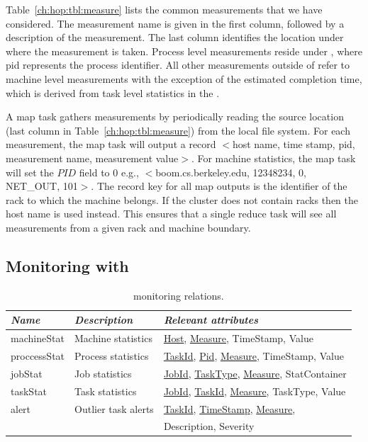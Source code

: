 Table~\ref{ch:hop:tbl:measure} lists the common measurements that we have considered. The 
measurement name is given in the first column, followed by a description of the measurement. The last column
identifies the location under  where the measurement is taken. Process level measurements 
reside under , where pid represents the process identifier. All other measurements outside of  
refer to machine level measurements with the exception of the estimated completion time, which is derived from task level
statistics in the \JT.

A map task gathers measurements by periodically reading the source location (last column in Table~\ref{ch:hop:tbl:measure}) from the local file system. 
For each measurement, the map task will output a record $<$host name, time stamp, pid, measurement name, measurement value$>$.
For machine statistics, the map task will set the $PID$ field to $0$ e.g., $<$boom.cs.berkeley.edu, 12348234, 0, NET\_OUT, 101$>$.
The record key for all map outputs is the identifier of the rack to which the machine belongs. If the cluster does not contain racks then 
the host name is used instead. This ensures that a single reduce task will see all measurements from a given rack and machine boundary. 

\subsection{Monitoring with \OVERLOG}

\begin{table}
\ssp
\centering
\begin{tabular}{|l|l|l|} \hline
\textit{Name}    & \textit{Description} & \textit{Relevant attributes} \\ \hline\hline
machineStat    & Machine statistics   & \underline{Host}, \underline{Measure}, TimeStamp, Value \\ \hline
proccessStat   & Process statistics    & \underline{TaskId}, \underline{Pid}, \underline{Measure}, TimeStamp, Value \\ \hline
jobStat              & Job statistics            & \underline{JobId}, \underline{TaskType}, \underline{Measure}, StatContainer \\ \hline
taskStat            & Task statistics          & \underline{JobId}, \underline{TaskId}, \underline{Measure}, TaskType, Value \\ \hline
alert                   & Outlier task alerts   & \underline{TaskId}, \underline{TimeStamp}, \underline{Measure}, \\
                           &                                   & Description, Severity \\ \hline
\end{tabular}
\caption{\JOL monitoring relations.}
\label{ch:hop:tbl:monitorCatalog}
\end{table}

